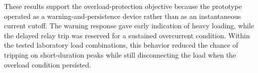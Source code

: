 These results support the overload-protection objective because the prototype
operated as a warning-and-persistence device rather than as an instantaneous
current cutoff. The warning response gave early indication of heavy loading,
while the delayed relay trip was reserved for a sustained overcurrent condition.
Within the tested laboratory load combinations, this behavior reduced the chance
of tripping on short-duration peaks while still disconnecting the load when the
overload condition persisted.
